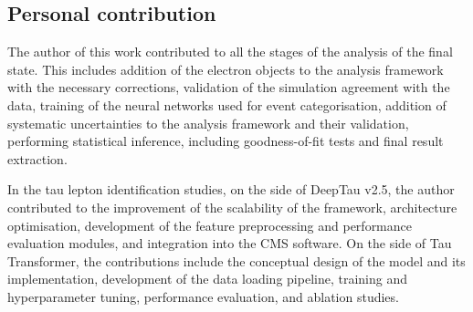 \subsection*{Personal contribution}
The author of this work contributed to all the stages of the analysis of the \et final state. This includes addition of the electron objects to the analysis framework with the necessary corrections, validation of the simulation agreement with the data, training of the neural networks used for event categorisation, addition of systematic uncertainties to the analysis framework and their validation, performing statistical inference, including goodness-of-fit tests and final result extraction. 

In the tau lepton identification studies, on the side of DeepTau v2.5, the author contributed to the improvement of the scalability of the framework, architecture optimisation, development of the feature preprocessing and performance evaluation modules, and integration into the CMS software. On the side of Tau Transformer, the contributions include the conceptual design of the model and its implementation, development of the data loading pipeline, training and hyperparameter tuning, performance evaluation, and ablation studies.